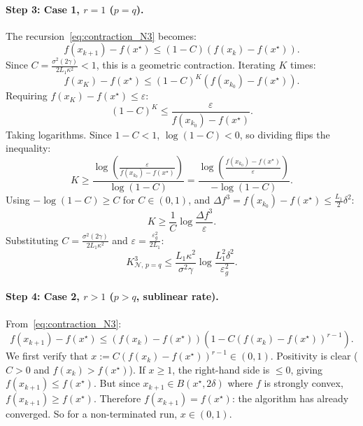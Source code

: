 \documentclass{article}
\begin{document}
\paragraph{Step 3: Case 1, $r = 1$ ($p = q$).} The recursion~\eqref{eq:contraction_N3} becomes:
\[
f(x_{k+1}) - f(x^\star) \leq (1 - C)(f(x_k) - f(x^\star)).
\]
Since $C = \frac{\sigma^2(2\gamma)}{2L_1\kappa^2} < 1$, this is a geometric contraction. Iterating $K$ times:
\[
f(x_K) - f(x^\star) \leq (1 - C)^K(f(x_{k_0}) - f(x^\star)).
\]
Requiring $f(x_K) - f(x^\star) \leq \varepsilon$:
\[
(1 - C)^K \leq \frac{\varepsilon}{f(x_{k_0}) - f(x^\star)}.
\]
Taking logarithms. Since $1 - C < 1$, $\log(1 - C) < 0$, so dividing flips the inequality:
\[
K \geq \frac{\log\left(\frac{\varepsilon}{f(x_{k_0}) - f(x^\star)}\right)}{\log(1 - C)} = \frac{\log\left(\frac{f(x_{k_0}) - f(x^\star)}{\varepsilon}\right)}{-\log(1 - C)}.
\]
Using $-\log(1 - C) \geq C$ for $C \in (0,1)$, and $\Delta f^3 = f(x_{k_0}) - f(x^\star) \leq \frac{L_1}{2}\delta^2$:
\[
K \geq \frac{1}{C}\log\frac{\Delta f^3}{\varepsilon}.
\]
Substituting $C = \frac{\sigma^2(2\gamma)}{2L_1\kappa^2}$ and $\varepsilon = \frac{\varepsilon_g^2}{2L_1}$:
\begin{equation}
\label{eq:N3_r1}
K^3_{\mathcal{N},\, p=q} \leq \frac{L_1\kappa^2}{\sigma^2\gamma}\log\frac{L_1^2\delta^2}{\varepsilon_g^2}.
\end{equation}

\paragraph{Step 4: Case 2, $r > 1$ ($p > q$, sublinear rate).} From~\eqref{eq:contraction_N3}:
\[
f(x_{k+1}) - f(x^\star) \leq (f(x_k) - f(x^\star))\left(1 - C(f(x_k) - f(x^\star))^{r-1}\right).
\]
We first verify that $x := C(f(x_k) - f(x^\star))^{r-1} \in (0,1)$. Positivity is clear ($C > 0$ and $f(x_k) > f(x^\star)$). If $x \geq 1$, the right-hand side is $\leq 0$, giving $f(x_{k+1}) \leq f(x^\star)$. But since $x_{k+1} \in B(x^\star, 2\delta)$ where $f$ is strongly convex, $f(x_{k+1}) \geq f(x^\star)$. Therefore $f(x_{k+1}) = f(x^\star)$: the algorithm has already converged. So for a non-terminated run, $x \in (0,1)$.
\end{document}
